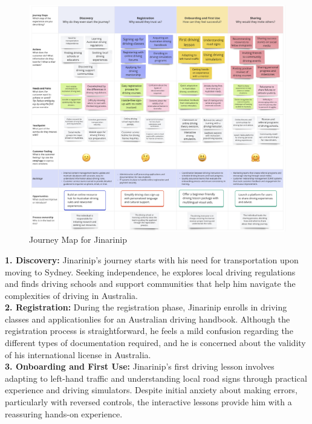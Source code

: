 \documentclass[12pt,a4paper]{article}
\begin{document}
\begin{figure}[h]
  \centering
  \includegraphics[width=1.0\textwidth]{images/JourneyMap.png}
  \caption{Journey Map for Jinarinip}
  \label{fig:empathy-map}
\end{figure}

\noindent\textbf{1. Discovery:} Jinarinip's journey starts with his need for transportation upon moving to Sydney. Seeking independence, he explores local driving regulations and finds driving schools and support communities that help him navigate the complexities of driving in Australia.\\

\noindent\textbf{2. Registration:} During the registration phase, Jinarinip enrolls in driving classes and applicationlies for an Australian driving handbook. Although the registration process is straightforward, he feels a mild confusion regarding the different types of documentation required, and he is concerned about the validity of his international license in Australia.
\\

\noindent\textbf{3. Onboarding and First Use:} Jinarinip's first driving lesson involves adapting to left-hand traffic and understanding local road signs through practical experience and driving simulators. Despite initial anxiety about making errors, particularly with reversed controls, the interactive lessons provide him with a reassuring hands-on experience.
\\
\end{document}
